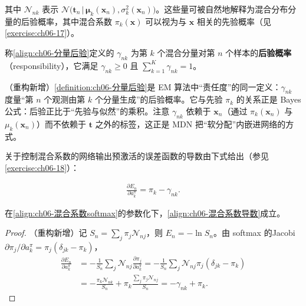 \documentclass[../../main.tex]{subfiles}
\begin{document}
其中 $\mathcal{N}_{nk}$ 表示 $\mathcal{N}\bigl(\boldsymbol{t}_n\,\big|\,\boldsymbol{\mu}_k(\boldsymbol{x}_n),\sigma_k^{2}(\boldsymbol{x}_n)\bigr)$。这些量可被自然地解释为混合分布分量的后验概率，其中混合系数 $\pi_k(\boldsymbol{x})$ 可以视为与 $\boldsymbol{x}$ 相关的先验概率（见\cref{exercise:ch06-17}）。

\begin{definition}[分量后验概率]\label{definition:ch06-分量后验}
称\eqref{align:ch06-分量后验}定义的 $\gamma_{nk}$ 为第 $k$ 个混合分量对第 $n$ 个样本的\textbf{后验概率}（responsibility），它满足 $\gamma_{nk}\geqslant0$ 且 $\sum_{k=1}^{K}\gamma_{nk}=1$。
\end{definition}

\begin{remark}（重构新增）\cref{definition:ch06-分量后验}是 EM 算法中“责任度”的同一定义：$\gamma_{nk}$ 度量“第 $n$ 个观测由第 $k$ 个分量生成”的后验概率。它与先验 $\pi_k$ 的关系正是 Bayes 公式：后验正比于“先验与似然”的乘积。注意 $\gamma_{nk}$ 依赖于 $\boldsymbol{x}_n$（通过 $\pi_k(\boldsymbol{x}_n)$ 与 $\mu_k(\boldsymbol{x}_n)$）而不依赖于 $\boldsymbol{t}$ 之外的标签，这正是 MDN 把“软分配”内嵌进网络的方式。
\end{remark}

关于控制混合系数的网络输出预激活的误差函数的导数由下式给出（参见\cref{exercise:ch06-18}）：

\begin{align}
\frac{\partial E_n}{\partial a_k^{\pi}}=\pi_k-\gamma_{nk}.
\label{align:ch06-混合系数导数}
\end{align}

\begin{proposition}[混合系数预激活的导数]\label{proposition:ch06-混合系数导数}
在\eqref{align:ch06-混合系数softmax}的参数化下，\eqref{align:ch06-混合系数导数}成立。
\end{proposition}

\begin{proof}
（重构新增）记 $S_n=\sum_{j}\pi_j\mathcal{N}_{nj}$，则 $E_n=-\ln S_n$。由 softmax 的Jacobi $\partial\pi_j/\partial a_k^{\pi}=\pi_j(\delta_{jk}-\pi_k)$，
\begin{align}
\frac{\partial E_n}{\partial a_k^{\pi}}
&=-\frac{1}{S_n}\sum_{j}\mathcal{N}_{nj}\frac{\partial\pi_j}{\partial a_k^{\pi}}
=-\frac{1}{S_n}\sum_{j}\mathcal{N}_{nj}\pi_j(\delta_{jk}-\pi_k)\nonumber\\
&=-\frac{\pi_k\mathcal{N}_{nk}}{S_n}+\pi_k\frac{\sum_j\pi_j\mathcal{N}_{nj}}{S_n}
=-\gamma_{nk}+\pi_k .
\end{align}
\end{proof}
\end{document}

